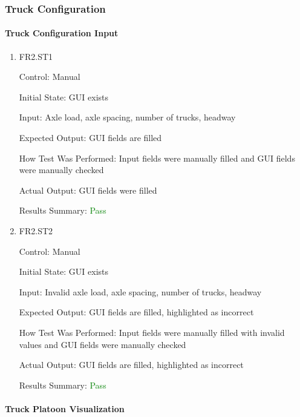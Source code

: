 \documentclass[12pt, titlepage]{article}
\begin{document}
\subsubsection{Truck Configuration}

\paragraph{Truck Configuration Input}

\begin{enumerate}

  \item{FR2.ST1\\}

  Control: Manual

  Initial State: GUI exists

  Input: Axle load, axle spacing, number of trucks, headway

  Expected Output: GUI fields are filled

  How Test Was Performed: Input fields were manually filled and GUI fields were manually checked

  Actual Output: GUI fields were filled

  Results Summary: \textcolor{green} {Pass}

  \item{FR2.ST2\\}

  Control: Manual

  Initial State: GUI exists

  Input: Invalid axle load, axle spacing, number of trucks, headway

  Expected Output: GUI fields are filled, highlighted as incorrect

  How Test Was Performed: Input fields were manually filled with invalid values and GUI fields were manually checked

  Actual Output: GUI fields are filled, highlighted as incorrect

  Results Summary: \textcolor{green} {Pass}

\end{enumerate}

\paragraph{Truck Platoon Visualization}
\end{document}
